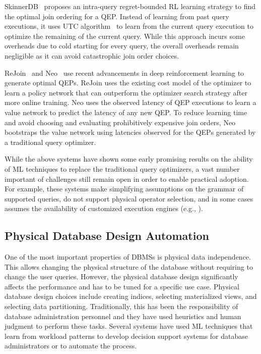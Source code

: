 SkinnerDB~\cite{skinnerdb} proposes an intra-query regret-bounded RL learning strategy to find the optimal join ordering for a QEP.
Instead of learning from past query executions, it uses UTC algorithm~\cite{utc} to learn from the current query execution to optimize the remaining of the current query.
While this approach incurs some overheads due to cold starting for every query, the overall overheads remain negligible as it can avoid catastrophic join order choices.

ReJoin~\cite{rejoin} and Neo~\cite{neo} use recent advancements in deep reinforcement learning to generate optimal QEPs.
ReJoin uses the existing cost model of the optimizer to learn a policy network that can outperform the optimizer search strategy after more online training.
Neo uses the observed latency of QEP executions to learn a value network to predict the latency of any new QEP.
To reduce learning time and avoid choosing and evaluating prohibitively expensive join orders, Neo bootstraps the value network using latencies observed for the QEPs generated by a traditional query optimizer.

While the above systems have shown some early promising results on the ability of ML techniques to replace the traditional query optimizers, a vast number important of challenges still remain open in order to enable practical adoption.
For example, these systems make simplifying assumptions on the grammar of supported queries, do not support physical operator selection, and in some cases assumes the availability of customized execution engines (e.g., \cite{skinnerdb}).


\subsection{Physical Database Design Automation}
One of the most important properties of  DBMSs is physical data independence.
This allows changing the physical structure of the database without requiring to change the user queries.
However, the physical database design significantly affects the performance and has to be tuned for a specific use case.
Physical database design choices include creating indices, selecting materialized views, and selecting data partitioning.
Traditionally, this has been the responsibility of database administration personnel and they have used heuristics and human judgment to perform these tasks.
Several systems have used ML techniques that learn from workload patterns to develop decision support systems for database administrators or to automate the process.


